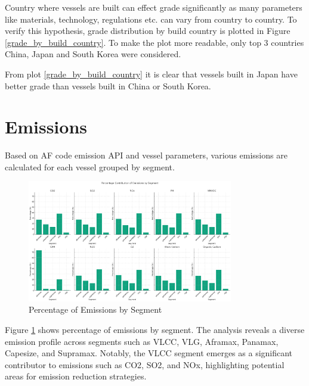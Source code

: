 Country where vessels are built can effect grade significantly as many parameters like materials, technology, regulations etc. can vary from country to country.
To verify this hypothesis, grade distribution by build country is plotted in Figure \ref{grade_by_build_country}.
To make the plot more readable, only top 3 countries China, Japan and South Korea were considered.

From plot \ref{grade_by_build_country} it is clear that vessels built in Japan have better grade than vessels built in China or South Korea.


\section{Emissions}

Based on AF code emission API and vessel parameters, various emissions are calculated for each vessel grouped by segment.

\begin{figure}[h]
    \centering
    \includegraphics[width=0.8\textwidth]{images/segment_emissions.png}
    \caption{Percentage of Emissions by Segment}
    \label{segment_emissions}
\end{figure}

Figure \ref{segment_emissions} shows percentage of emissions by segment.
The analysis reveals a diverse emission profile across segments such as VLCC, VLG, Aframax, Panamax, Capesize, and Supramax. 
Notably, the VLCC segment emerges as a significant contributor to emissions such as CO2, SO2, and NOx, highlighting potential areas for emission reduction strategies.